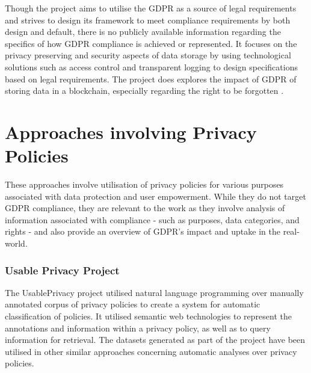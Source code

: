 Though the project aims to utilise the GDPR as a source of legal requirements and strives to design its framework to meet compliance requirements by both design and default, there is no publicly available information regarding the specifics of how GDPR compliance is achieved or represented.
It focuses on the privacy preserving and security aspects of data storage by using technological solutions such as access control and transparent logging to design specifications based on legal requirements.
The project does explores the impact of GDPR of storing data in a blockchain, especially regarding the right to be forgotten \cite{bayle_when_2018}.

\section{Approaches involving Privacy Policies}\label{sec:sota:privacy-policies}
These approaches involve utilisation of privacy policies for various purposes associated with data protection and user empowerment. While they do not target GDPR compliance, they are relevant to the work as they involve analysis of information associated with compliance - such as purposes, data categories, and rights - and also provide an overview of GDPR's impact and uptake in the real-world.

\subsubsection{Usable Privacy Project}
The UsablePrivacy project \cite{sadeh_usable_2013} utilised natural language programming over manually annotated corpus of privacy policies to create a system for automatic classification of policies. 
It utilised semantic web technologies \cite{oltramari_privonto_2018} to represent the annotations and information within a privacy policy, as well as to query information for retrieval.
The datasets generated as part of the project have been utilised in other similar approaches \cite{harkous_polisis_2018,linden_privacy_2018} concerning automatic analyses over privacy policies. 

